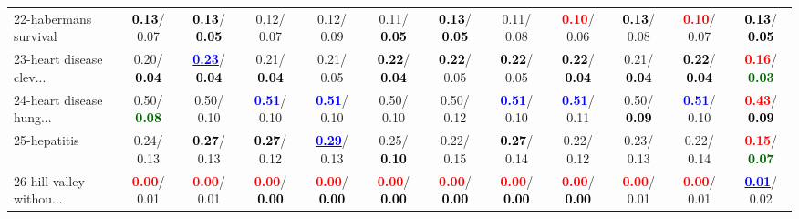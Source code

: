 \begin{table}[h]
\begin{center}
{\begin{tabular}{lc|c|c|c|c|c|c|c|c|c|c}
22-habermans survival & \textcolor{black}{\textbf{  0.13}}/  0.07 & \textcolor{black}{\textbf{  0.13}}/\textcolor{black}{\textbf{  0.05}} &   0.12/  0.07 &   0.12/  0.09 &   0.11/\textcolor{black}{\textbf{  0.05}} & \textcolor{black}{\textbf{  0.13}}/\textcolor{black}{\textbf{  0.05}} &   0.11/  0.08 & \textcolor{red}{\textbf{  0.10}}/  0.06 & \textcolor{black}{\textbf{  0.13}}/  0.08 & \textcolor{red}{\textbf{  0.10}}/  0.07 & \textcolor{black}{\textbf{  0.13}}/\textcolor{black}{\textbf{  0.05}} \\
23-heart disease clev... &   0.20/\textcolor{black}{\textbf{  0.04}} & \underline{\textcolor{blue}{\textbf{  0.23}}}/\textcolor{black}{\textbf{  0.04}} &   0.21/\textcolor{black}{\textbf{  0.04}} &   0.21/  0.05 & \textcolor{black}{\textbf{  0.22}}/\textcolor{black}{\textbf{  0.04}} & \textcolor{black}{\textbf{  0.22}}/  0.05 & \textcolor{black}{\textbf{  0.22}}/  0.05 & \textcolor{black}{\textbf{  0.22}}/\textcolor{black}{\textbf{  0.04}} &   0.21/\textcolor{black}{\textbf{  0.04}} & \textcolor{black}{\textbf{  0.22}}/\textcolor{black}{\textbf{  0.04}} & \textcolor{red}{\textbf{  0.16}}/\textcolor{darkgreen}{\textbf{  0.03}} \\
24-heart disease hung... &   0.50/\textcolor{darkgreen}{\textbf{  0.08}} &   0.50/  0.10 & \textcolor{blue}{\textbf{  0.51}}/  0.10 & \textcolor{blue}{\textbf{  0.51}}/  0.10 &   0.50/  0.10 &   0.50/  0.12 & \textcolor{blue}{\textbf{  0.51}}/  0.10 & \textcolor{blue}{\textbf{  0.51}}/  0.11 &   0.50/\textcolor{black}{\textbf{  0.09}} & \textcolor{blue}{\textbf{  0.51}}/  0.10 & \textcolor{red}{\textbf{  0.43}}/\textcolor{black}{\textbf{  0.09}} \\
25-hepatitis &   0.24/  0.13 & \textcolor{black}{\textbf{  0.27}}/  0.13 & \textcolor{black}{\textbf{  0.27}}/  0.12 & \underline{\textcolor{blue}{\textbf{  0.29}}}/  0.13 &   0.25/\textcolor{black}{\textbf{  0.10}} &   0.22/  0.15 & \textcolor{black}{\textbf{  0.27}}/  0.14 &   0.22/  0.12 &   0.23/  0.13 &   0.22/  0.14 & \textcolor{red}{\textbf{  0.15}}/\textcolor{darkgreen}{\textbf{  0.07}} \\
26-hill valley withou... & \textcolor{red}{\textbf{  0.00}}/  0.01 & \textcolor{red}{\textbf{  0.00}}/  0.01 & \textcolor{red}{\textbf{  0.00}}/\textcolor{black}{\textbf{  0.00}} & \textcolor{red}{\textbf{  0.00}}/\textcolor{black}{\textbf{  0.00}} & \textcolor{red}{\textbf{  0.00}}/\textcolor{black}{\textbf{  0.00}} & \textcolor{red}{\textbf{  0.00}}/\textcolor{black}{\textbf{  0.00}} & \textcolor{red}{\textbf{  0.00}}/\textcolor{black}{\textbf{  0.00}} & \textcolor{red}{\textbf{  0.00}}/\textcolor{black}{\textbf{  0.00}} & \textcolor{red}{\textbf{  0.00}}/  0.01 & \textcolor{red}{\textbf{  0.00}}/  0.01 & \underline{\textcolor{blue}{\textbf{  0.01}}}/  0.02 \\

\end{tabular}}
\end{center}
\end{table}
